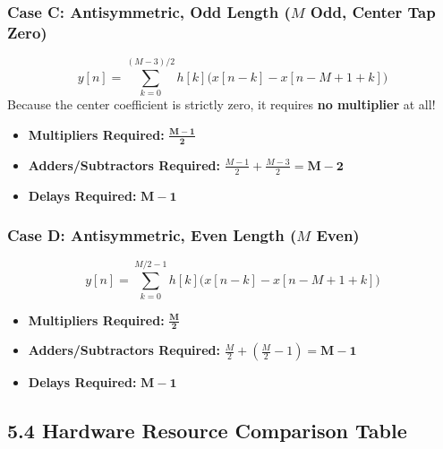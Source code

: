 \documentclass[11pt,a4paper]{article}
\begin{document}
\subsubsection{\texorpdfstring{Case C: Antisymmetric, Odd Length ($M$ Odd, Center Tap Zero)}{Case C: Antisymmetric, Odd Length}}
\begin{equation}
y[n] = \sum_{k=0}^{(M-3)/2} h[k] \Big( x[n-k] - x[n - M + 1 + k] \Big)
\end{equation}
Because the center coefficient is strictly zero, it requires \textbf{no multiplier} at all!
\begin{itemize}
    \item \textbf{Multipliers Required:} $\mathbf{\frac{M-1}{2}}$
    \item \textbf{Adders/Subtractors Required:} $\frac{M-1}{2} + \frac{M-3}{2} = \mathbf{M - 2}$
    \item \textbf{Delays Required:} $\mathbf{M - 1}$
\end{itemize}

\subsubsection{\texorpdfstring{Case D: Antisymmetric, Even Length ($M$ Even)}{Case D: Antisymmetric, Even Length}}
\begin{equation}
y[n] = \sum_{k=0}^{M/2 - 1} h[k] \Big( x[n-k] - x[n - M + 1 + k] \Big)
\end{equation}
\begin{itemize}
    \item \textbf{Multipliers Required:} $\mathbf{\frac{M}{2}}$
    \item \textbf{Adders/Subtractors Required:} $\frac{M}{2} + \left(\frac{M}{2} - 1\right) = \mathbf{M - 1}$
    \item \textbf{Delays Required:} $\mathbf{M - 1}$
\end{itemize}

\subsection{5.4 Hardware Resource Comparison Table}
\end{document}
